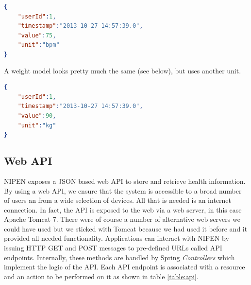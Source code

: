 \begin{lstlisting}[language=json]
{
	"userId":1,
	"timestamp":"2013-10-27 14:57:39.0",
	"value":75,
	"unit":"bpm"
}
\end{lstlisting}

A weight model looks pretty much the same (see below), but uses another unit.

\begin{lstlisting}[language=json]
{
	"userId":1,
	"timestamp":"2013-10-27 14:57:39.0",
	"value":90,
	"unit":"kg"
}
\end{lstlisting} 

\subsection{Web API}
\label{subsec:api}

NIPEN exposes a JSON based web API to store and retrieve health information.
By using a web API, we ensure that the system is accessible to a broad number of users
an from a wide selection of devices. All that is needed is an internet connection.
In fact, the API is exposed to the web via a web server, in this case Apache Tomcat 7.
There were of course a number of alternative web servers we could have used but we sticked
with Tomcat because we had used it before and it provided all needed functionality.
Applications can interact with NIPEN by issuing HTTP GET and POST messages to pre-defined URLs called API endpoints.
Internally, these methods are handled by Spring \textit{Controllers} which implement the logic of the API.
Each API endpoint is associated with a resource and an action to be performed on it as shown in table \ref{table:api}.

